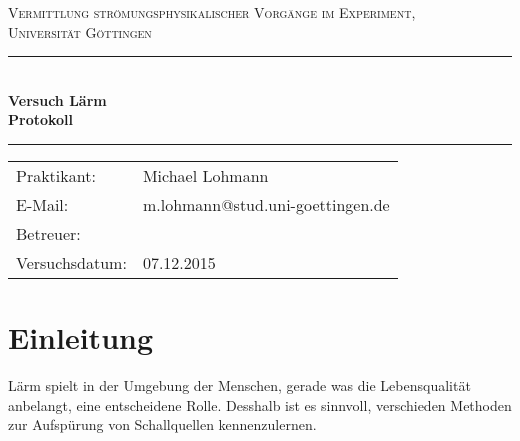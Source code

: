 \documentclass[12pt,a4paper,titlepage,headinclude,bibtotoc]{scrartcl}
\begin{document}
\begin{titlepage}
\centering
\textsc{\Large Vermittlung strömungsphysikalischer Vorgänge im Experiment,
\\[1.5ex] Universität Göttingen}

\vspace*{3cm}

\rule{\textwidth}{1pt}\\[0.5cm]
{\huge \bfseries
  Versuch Lärm  \\[1.5ex]
  Protokoll}\\[0.5cm]
\rule{\textwidth}{1pt}

\vspace*{3cm}

\begin{Large}
\begin{tabular}{ll}
Praktikant: &  Michael Lohmann\\
 E-Mail: & m.lohmann@stud.uni-goettingen.de\\
 Betreuer: & \\
 Versuchsdatum: & 07.12.2015\\
\end{tabular}
\end{Large}

\vspace*{0.8cm}

\begin{Large}
\end{Large}

\end{titlepage}

\tableofcontents

\newpage

\section{Einleitung}
\label{sec:einleitung}
Lärm spielt in der Umgebung der Menschen, gerade was die Lebensqualität anbelangt, eine entscheidene Rolle.
Desshalb ist es sinnvoll, verschieden Methoden zur Aufspürung von Schallquellen kennenzulernen.
\end{document}
